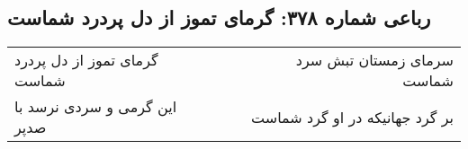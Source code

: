 \begin{center}
\section*{رباعی شماره ۳۷۸: گرمای تموز از دل پردرد شماست}
\label{sec:0378}
\begin{longtable}{l p{0.5cm} r}
گرمای تموز از دل پردرد شماست
&&
سرمای زمستان تبش سرد شماست
\\
این گرمی و سردی نرسد با صدپر
&&
بر گرد جهانیکه در او گرد شماست
\\
\end{longtable}
\end{center}
